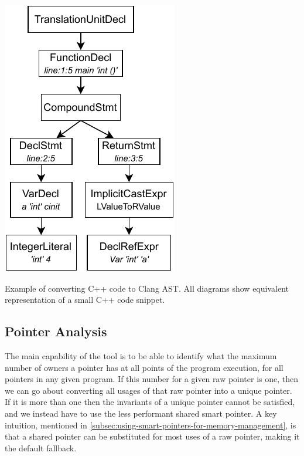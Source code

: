 \documentclass{proposal}
\begin{document}
    \begin{listing}
        \inputminted{c++}{code/code-to-ast.cpp}
        \inputminted[fontsize=\footnotesize]{text}{code/code-to-ast.txt}
        \centerline{\includegraphics{images/code-to-ast}}
        \caption{Example of converting C++ code to Clang AST. All diagrams show equivalent representation of a small C++ code snippet.}
        \label{lst:code-to-ast-example}
    \end{listing}

    \subsection{Pointer Analysis}\label{subsec:pointer-analysis}

    The main capability of the tool is to be able to identify what the maximum number of owners a pointer has at all points of the program execution, for all pointers in any given program.
    If this number for a given raw pointer is one, then we can go about converting all usages of that raw pointer into a unique pointer.
    If it is more than one then the invariants of a unique pointer cannot be satisfied, and we instead have to use the less performant shared smart pointer.
    A key intuition, mentioned in \autoref{subsec:using-smart-pointers-for-memory-management}, is that a shared pointer can be substituted for most uses of a raw pointer, making it the default fallback.
\end{document}
